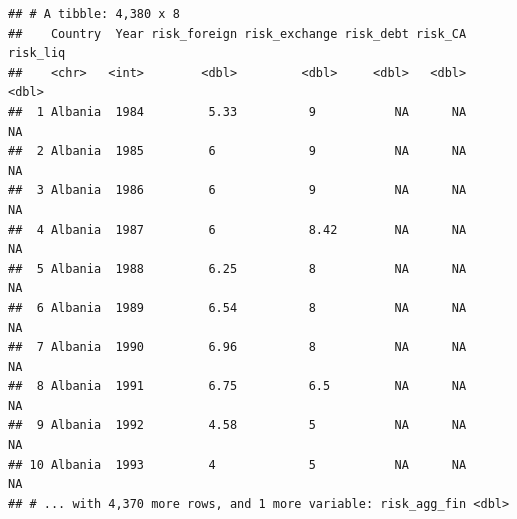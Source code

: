\documentclass[12pt,]{article}
\newenvironment{Shaded}{\begin{snugshade}}{\end{snugshade}}
\newcommand{\KeywordTok}[1]{\textcolor[rgb]{0.13,0.29,0.53}{\textbf{#1}}}
\newcommand{\DataTypeTok}[1]{\textcolor[rgb]{0.13,0.29,0.53}{#1}}
\newcommand{\StringTok}[1]{\textcolor[rgb]{0.31,0.60,0.02}{#1}}
\newcommand{\OperatorTok}[1]{\textcolor[rgb]{0.81,0.36,0.00}{\textbf{#1}}}
\newcommand{\NormalTok}[1]{#1}
\begin{document}
\begin{Shaded}
\end{Shaded}

\begin{verbatim}
## # A tibble: 4,380 x 8
##    Country  Year risk_foreign risk_exchange risk_debt risk_CA risk_liq
##    <chr>   <int>        <dbl>         <dbl>     <dbl>   <dbl>    <dbl>
##  1 Albania  1984         5.33          9           NA      NA       NA
##  2 Albania  1985         6             9           NA      NA       NA
##  3 Albania  1986         6             9           NA      NA       NA
##  4 Albania  1987         6             8.42        NA      NA       NA
##  5 Albania  1988         6.25          8           NA      NA       NA
##  6 Albania  1989         6.54          8           NA      NA       NA
##  7 Albania  1990         6.96          8           NA      NA       NA
##  8 Albania  1991         6.75          6.5         NA      NA       NA
##  9 Albania  1992         4.58          5           NA      NA       NA
## 10 Albania  1993         4             5           NA      NA       NA
## # ... with 4,370 more rows, and 1 more variable: risk_agg_fin <dbl>
\end{verbatim}
\end{document}
